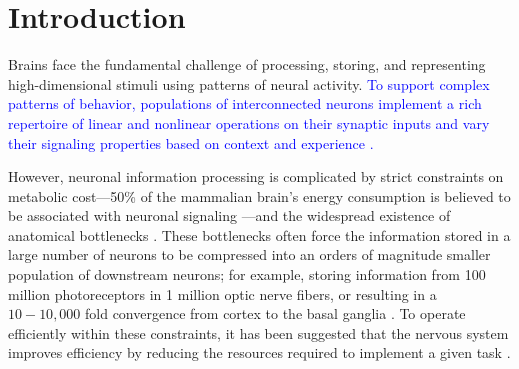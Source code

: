 \section*{Introduction}
\label{sec:introduction}
Brains face the fundamental challenge of 
processing, storing, and representing high-dimensional stimuli
using patterns of neural activity.
\textcolor{blue}{To support complex patterns of behavior, 
populations of interconnected neurons implement 
a rich repertoire of linear and nonlinear operations on their synaptic inputs
and vary their signaling properties based on context and experience
\cite{Koch1999}.}

However, neuronal information processing is complicated
by strict constraints on metabolic cost---50\% of the 
mammalian brain's energy consumption is believed to be associated with 
neuronal signaling \cite{Laughlin2001, Lennie2003}---and the 
widespread existence of anatomical bottlenecks 
\cite{Kempermann2002,BarGad2003_Review,Babinsky1993}.
These bottlenecks often force the information
stored in a large number of neurons
to be compressed into an orders of magnitude smaller population
of downstream neurons;
for example, storing information from 100 million photoreceptors 
in 1 million optic nerve fibers,
or resulting in a $10 - 10,000$ fold convergence from cortex to the basal ganglia
\cite{BarGad2003_Review}.
To operate efficiently within these constraints,
it has been suggested that the nervous system improves 
efficiency by reducing the resources
required to implement a given task \cite{LaughlinSejnowski2003}.

